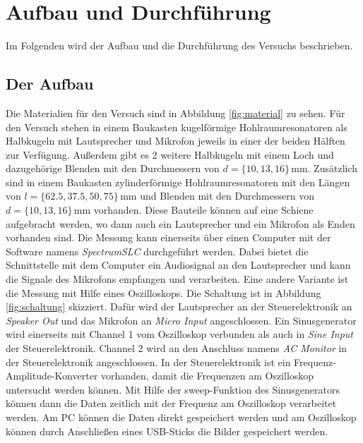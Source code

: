 \section{Aufbau und Durchführung}
\label{sec:auf_durch}

Im Folgenden wird der Aufbau und die Durchführung des Versuchs beschrieben.

\subsection{Der Aufbau}
\label{sec:aufbau}

Die Materialien für den Versuch sind in Abbildung \ref{fig:material} zu sehen. Für den Versuch stehen in einem Baukasten kugelförmige Hohlraumresonatoren als Halbkugeln mit Lautsprecher und Mikrofon jeweils in einer der beiden Hälften zur Verfügung. Außerdem gibt es 2 weitere Halbkugeln mit einem Loch und dazugehörige Blenden mit den Durchmessern von $d = \{ 10, 13, 16 \} \, \mathrm{mm}$. Zusätzlich sind in einem Baukasten zylinderförmige Hohlraumresonatoren mit den Längen von $l = \{62.5,37.5, 50, 75\} \, \mathrm{mm}$ und Blenden mit den Durchmessern von $d = \{ 10, 13, 16 \} \, \mathrm{mm}$ vorhanden. Diese Bauteile können auf eine Schiene aufgebracht werden, wo dann auch ein Lautsprecher und ein Mikrofon als Enden vorhanden sind. Die Messung kann einerseits über einen Computer mit der Software namens \textit{SpectrumSLC} durchgeführt werden. Dabei bietet die Schnittstelle mit dem Computer ein Audiosignal an den Lautsprecher und kann die Signale des Mikrofons empfangen und verarbeiten. Eine andere Variante ist die Messung mit Hilfe eines Oszilloskops. Die Schaltung ist in Abbildung \ref{fig:schaltung} skizziert. Dafür wird der Lautsprecher an der Steuerelektronik an \textit{Speaker Out} und das Mikrofon an \textit{Micro Input} angeschlossen. Ein Sinusgenerator wird einerseits mit Channel 1 vom Oszilloskop verbunden als auch in \textit{Sine Input} der Steuerelektronik. Channel 2 wird an den Anschluss namens \textit{AC Monitor} in der Steuerelektronik angeschlossen. In der Steuerelektronik ist ein Frequenz-Amplitude-Konverter vorhanden, damit die Frequenzen am Oszilloskop untersucht werden können. Mit Hilfe der sweep-Funktion des Sinusgenerators können dann die Daten zeitlich mit der Frequenz am Oszilloskop verarbeitet werden. Am PC können die Daten direkt gespeichert werden und am Oszilloskop können durch Anschließen eines USB-Sticks die Bilder gespeichert werden.

